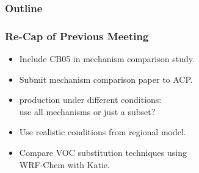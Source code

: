 \begin{frame}
    \frametitle{Outline} 
    \tableofcontents[currentsection]
\end{frame} 

\begin{frame}
    \frametitle{Re-Cap of Previous Meeting}

    \vspace{-6mm}
    \begin{itemize}
        \item Include CB05 in mechanism comparison study. \vspace{3mm}
        \item Submit mechanism comparison paper to ACP. \vspace{3mm}
        \item {} production under different conditions:\\use all mechanisms or just a subset?\vspace{3mm}
        \item Use realistic conditions from regional model. \vspace{3mm}
        \item Compare VOC substitution techniques using \\WRF-Chem with Katie.
    \end{itemize} 
\end{frame} 
